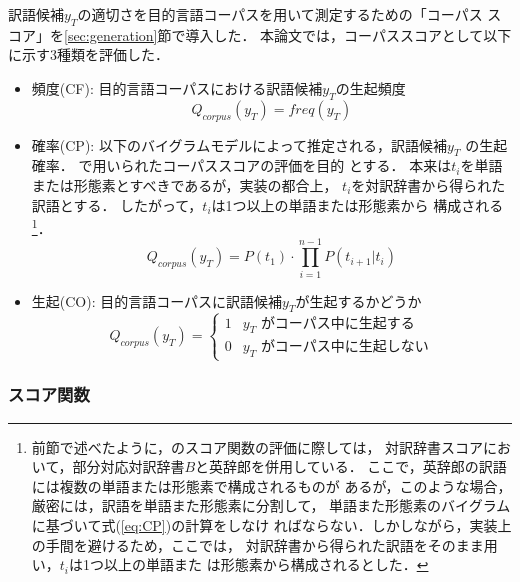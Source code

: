\documentclass[japanese]{jnlp_1.3a}
\begin{document}
訳語候補$y_T$の適切さを目的言語コーパスを用いて測定するための「コーパス
スコア」を\ref{sec:generation}節で導入した．
本論文では，コーパススコアとして以下に示す3種類を評価した．
\begin{itemize}
 \item 頻度(CF): 目的言語コーパスにおける訳語候補$y_T$の生起頻度
\begin{equation}
 Q_{corpus}(y_T)= freq(y_T)
\end{equation}
 \item 確率(CP): 以下のバイグラムモデルによって推定される，訳語候補$y_T$
       の生起確率．
       \cite{Fujii00}で用いられたコーパススコアの評価を目的
       とする．
       本来は$t_i$を単語または形態素とすべきであるが，実装の都合上，
       $t_i$を対訳辞書から得られた訳語とする．
       したがって，$t_i$は1つ以上の単語または形態素から
       構成される\footnote{
	前節で述べたように，\cite{Fujii00}のスコア関数の評価に際しては，
       対訳辞書スコアにおいて，部分対応対訳辞書$B$と英辞郎を併用している．
       ここで，英辞郎の訳語には複数の単語または形態素で構成されるものが
       あるが，このような場合，厳密には，訳語を単語また形態素に分割して，
       単語また形態素のバイグラムに基づいて式(\ref{eq:CP})の計算をしなけ
       ればならない．しかしながら，実装上の手間を避けるため，ここでは，
       対訳辞書から得られた訳語をそのまま用い，$t_i$は1つ以上の単語また
       は形態素から構成されるとした．}．
\pagebreak
\begin{equation}
 \label{eq:CP}
 Q_{corpus}(y_T)= P(t_1) \cdot \prod_{i=1}^{n-1} P(t_{i+1}|t_i)
\end{equation}
 \item 生起(CO): 目的言語コーパスに訳語候補$y_T$が生起するかどうか
\begin{equation}
 Q_{corpus}(y_T)= 
  \begin{cases}
	   1 & \text{$y_T$ がコーパス中に生起する} \\
	   0 & \text{$y_T$ がコーパス中に生起しない} 
  \end{cases}
\end{equation}
\end{itemize}


\subsubsection{スコア関数}
\end{document}
